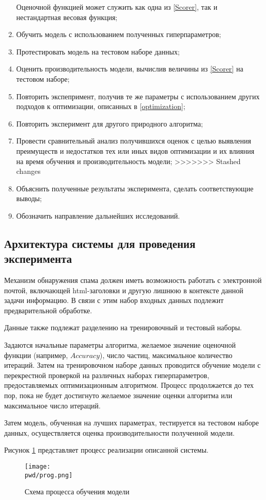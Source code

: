 \begin{enumerate}
          Оценочной функцией может служить как одна из \ref{Scorer}, так и
          нестандартная весовая функция;
    \item Обучить модель с использованием полученных гиперпараметров;
    \item Протестировать модель на тестовом наборе данных;
    \item Оценить производительность модели, вычислив величины из \ref{Scorer} на
          тестовом наборе;
    \item Повторить экспепримент, получив те же параметры с использованием
          других подходов к оптимизации, описанных в \ref{optimization};
    \item Повторить эксперимент для другого природного алгоритма;
    \item Провести сравнительный анализ получившихся оценок с целью выявления
          преимуществ и недостатков тех или иных видов оптимизации и их влияния на
          время обучения и производительность модели;
          >>>>>>> Stashed changes
    \item Объяснить полученные результаты эксперимента, сделать соответствующие выводы;
    \item Обозначить направление дальнейших исследований.
\end{enumerate}

\subsection{Архитектура системы для проведения эксперимента}

Механизм обнаружения спама должен иметь возможность работать с электронной почтой,
включающей html-заголовки и другую лишнюю в контексте данной задачи информацию.
В связи с этим набор входных данных подлежит предварительной обработке.

Данные также подлежат разделению на тренировочный и тестовый наборы.

Задаются начальные параметры алгоритма, желаемое значение оценочной функции (например, $Accuracy$),
число частиц, максимальное количество итераций. Затем на тренировочном наборе данных
проводится обучение модели с перекрестной проверкой на различных наборах
гиперпараметров, предоставляемых оптимизационным алгоритмом. Процесс продолжается
до тех пор, пока не будет достигнуто желаемое значение оценки алгоритма или
максимальное число итераций.

Затем модель, обученная на лучших параметрах, тестируется на тестовом наборе данных,
осуществляется оценка производительности полученной модели.

Рисунок \ref{scheme} представляет процесс реализации описанной системы.

\begin{figure}[H]
    \centering
    \texttt{[image: \\pwd/prog.png]}
    \caption{Схема процесса обучения модели}
    \label{scheme}
\end{figure}
